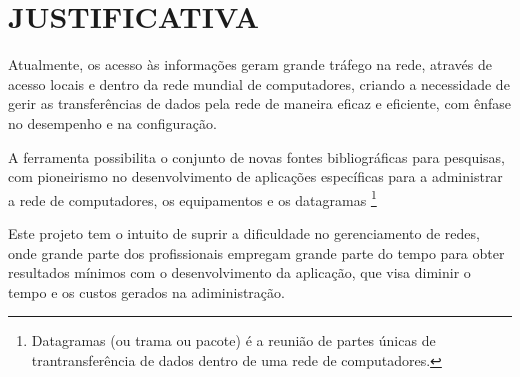 \chapter{JUSTIFICATIVA}

\par Atualmente, os acesso às informações geram grande tráfego na rede, através de acesso
locais e dentro da rede mundial de computadores, criando a necessidade de gerir as transferências
de dados pela rede de maneira eficaz e eficiente, com ênfase no desempenho e na configuração.

\par A ferramenta possibilita o conjunto de novas fontes bibliográficas para pesquisas, com
pioneirismo no desenvolvimento de aplicações específicas para a administrar a rede de computadores,
os equipamentos e os datagramas \footnote{Datagramas (ou trama ou pacote) é a reunião de partes únicas 
de trantransferência de dados dentro de uma rede de computadores.}

\par Este projeto tem o intuito de suprir a dificuldade no gerenciamento de redes, onde grande
parte dos profissionais empregam grande parte do tempo para obter resultados mínimos com o
desenvolvimento da aplicação, que visa diminir o tempo e os custos gerados na adiministração.



